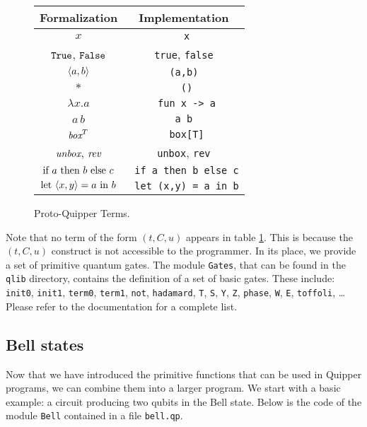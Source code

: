 \begin{figure}[!ht]
\begin{center}
\renewcommand{\arraystretch}{1.4}
\begin{tabular}{|c|c|}
  \hline
  \textbf{Formalization}          & \textbf{Implementation} \\\hline
  $x$                             & \verb# x# \\\hline
  $\texttt{True}$, $\texttt{False}$               & \verb#true#, \verb#false# \\\hline
  $\langle a, b \rangle$                   & \verb# (a,b) # \\\hline
  $*$                             & \verb# ()# \\\hline
  $\lambda x.a$                   & \verb# fun x -> a# \\\hline
  $a \, b$                        & \verb#a b# \\\hline
  $\mathop{\textit{box}}\nolimits^T$                       & \verb# box[T]# \\\hline
  $\mathop{\textit{unbox}}\nolimits$, $\mathop{\textit{rev}}\nolimits$                & \verb#unbox#, \verb#rev# \\\hline
  $\text{if}~ a ~\text{then}~ b ~\text{else}~ c$          & \verb# if a then b else c# \\\hline
  $\text{let}~ \langle x,y\rangle = a ~\text{in}~ b$         & \verb# let (x,y) = a in b# \\\hline
\end{tabular}
\end{center}
\caption{Proto-Quipper Terms.}
\label{terms}
\end{figure}

Note that no term of the form $(t,C,u)$ appears in table 
\hyperref[terms]{\ref*{terms}}. This is because the $(t,C,u)$ construct is 
not accessible to the programmer. In its place, we provide a set of 
primitive quantum gates. The module \verb#Gates#, that can be found in the 
\verb#qlib# directory, contains the definition of a set of basic gates. 
These include: \verb#init0#, \verb#init1#, \verb#term0#, \verb#term1#, 
\verb#not#, \verb#hadamard#, \verb#T#, \verb#S#, \verb#Y#, \verb#Z#, 
\verb#phase#, \verb#W#, \verb#E#, \verb#toffoli#, \ldots Please refer to 
the documentation for a complete list.

\subsection{Bell states}
\label{ssec-quipper-by-e}

Now that we have introduced the primitive functions that can be used in Quipper programs, we can combine them into a larger program. We start with 
a basic example: a circuit producing two qubits in the Bell state. Below is
the code of the module \verb#Bell# contained in a file \verb#bell.qp#.

